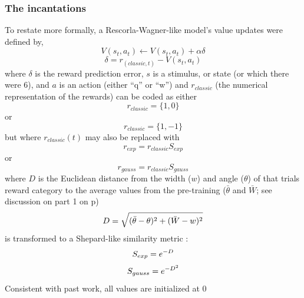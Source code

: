 \subsubsection{The incantations}
\label{subsub:incantations}
To restate more formally, a Rescorla-Wagner-like model's value updates were defined by,
\begin{equation} \label{eq:V} V(s_t,a_t) \leftarrow V(s_t,a_t) + \alpha\delta \end{equation} 
\begin{equation} \label{eq:rpe} \delta = r_{(classic,t)} - V(s_t,a_t) \end{equation}
where $\delta$ is the reward prediction error, $s$ is a stimulus, or state (or which there were 6), and $a$ is an action (either ``q'' or ``w'') and $r_{classic}$ (the numerical representation of the rewards) can be coded as either
\begin{equation}
    \label{eq:r1}
    r_{classic}= \{1,0\}
\end{equation}
or 
\begin{equation}
    \label{eq:r2}
    r_{classic}= \{1,-1\}
\end{equation}
but where $r_{classic}(t)$ may also be replaced with
\begin{equation}
    \label{eq:re}
    r_{exp} = r_{classic}S_{exp}
\end{equation}
or
\begin{equation}
    \label{eq:rg}
    r_{gauss} = r_{classic}S_{gauss}
\end{equation}
where $D$ is the Euclidean distance from the width ($w$) and angle ($\theta$) of that trials reward category to the average values from the pre-training ($\bar{\theta}$ and $\bar{W}$; see discussion on part 1 on p\pageref{subsub:whatwhen})
\begin{equation}
    \label{eq:D}\\
    D = \sqrt{(\bar{\theta} - \theta)^2 + (\bar{W}-w)^2}
\end{equation}
is transformed to a Shepard-like similarity metric \citep{Shepard:1987p9102}:
\begin{equation}
    \label{eq:Sexp}\\
    S_{exp} = e^{-D}
\end{equation}
\begin{equation}
    \label{eq:Sgauss}\\
    S_{gauss} = e^{-D^2}
\end{equation}
Consistent with past work, all values are initialized at 0 \citep{Beierholm:2011p8141,BischoffGrethe:2009p4570,Gershman:2009p7207}
